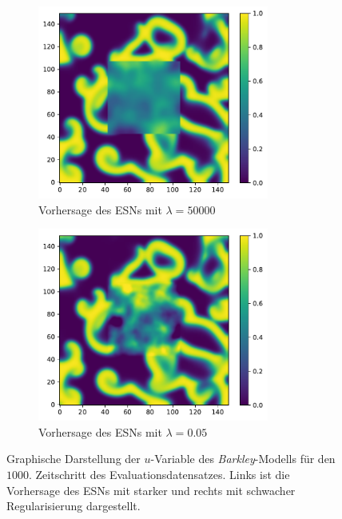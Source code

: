 \begin{figure}[h]
	\centering
	\begin{subfigure}{.5\textwidth}
		\centering
		\includegraphics[height=2.5in]{figures/results/inner_cross_prediction/barkley_u_inner_esn_high_penalty.pdf}
		\setcapmargin[1cm]{0.5cm}
		\caption{Vorhersage des \textsc{ESN}s mit $\lambda=50000$}
	\end{subfigure}%
	\begin{subfigure}{.5\textwidth}
		\centering
		\includegraphics[height=2.5in]{figures/results/inner_cross_prediction/barkley_u_inner_esn_low_penalty.pdf}
		\setcapmargin[1cm]{0.5cm}
  		\caption{Vorhersage des \textsc{ESN}s mit $\lambda=0.05$}
	\end{subfigure}
	\caption{Graphische Darstellung der $u$-Variable des \textit{Barkley}-Modells für den $1000$. Zeitschritt des Evaluationsdatensatzes. Links ist die Vorhersage des \textsc{ESN}s mit starker und rechts mit schwacher Regularisierung dargestellt.}
	\label{fig:exp_inner_cross_barkley_esn_comparison}
\end{figure} 

